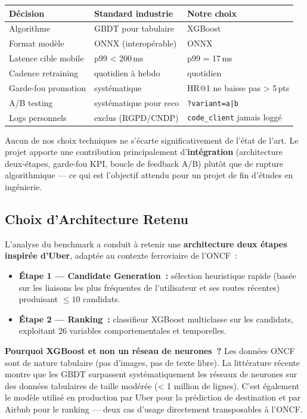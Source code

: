 \documentclass[12pt, a4paper]{report}
\begin{document}
\renewcommand{\arraystretch}{1.3}
\begin{tabularx}{\linewidth}{@{}p{3.5cm}p{3.5cm}X@{}}
\toprule
\textbf{Décision} & \textbf{Standard industrie} & \textbf{Notre choix} \\
\midrule
Algorithme & GBDT pour tabulaire & XGBoost \\
Format modèle & ONNX (interopérable) & ONNX \\
Latence cible mobile & p99 < 200\,ms & p99 = 17\,ms \\
Cadence retraining & quotidien à hebdo & quotidien \\
Garde-fou promotion & systématique & HR@1 ne baisse pas > 5\,pts \\
A/B testing & systématique pour reco & \texttt{?variant=a|b} \\
Logs personnels & exclus (RGPD/CNDP) & \texttt{code\_client} jamais loggé \\
\bottomrule
\end{tabularx}
\renewcommand{\arraystretch}{1}

Aucun de nos choix techniques ne s'écarte significativement de l'état
de l'art. Le projet apporte une contribution principalement
d'\textbf{intégration} (architecture deux-étapes, garde-fou KPI,
boucle de feedback A/B) plutôt que de rupture algorithmique --- ce qui
est l'objectif attendu pour un projet de fin d'études en ingénierie.

\subsection{Choix d'Architecture Retenu}

L'analyse du benchmark a conduit à retenir une \textbf{architecture deux
étapes inspirée d'Uber}, adaptée au contexte ferroviaire de l'ONCF~:

\begin{itemize}
\item \textbf{Étape 1 --- Candidate Generation~:} sélection heuristique
    rapide (basée sur les liaisons les plus fréquentes de l'utilisateur et
    ses routes récentes) produisant $\leq 10$ candidats.
\item \textbf{Étape 2 --- Ranking~:} classifieur XGBoost multiclasse sur
    les candidats, exploitant 26 variables comportementales et temporelles.
\end{itemize}

\textbf{Pourquoi XGBoost et non un réseau de neurones~?} Les données ONCF
sont de nature tabulaire (pas d'images, pas de texte libre). La littérature
récente~\cite{tabular-trees,tabular-gbdt} montre que les GBDT surpassent systématiquement les réseaux
de neurones sur des données tabulaires de taille modérée (< 1 million de
lignes). C'est également le modèle utilisé en production par Uber pour la
prédiction de destination et par Airbnb pour le ranking --- deux cas d'usage
directement transposables à l'ONCF.
\end{document}
